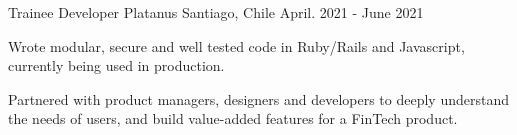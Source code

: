 

\begin{cventries}



\cventry
{Trainee Developer}
{Platanus}
{Santiago, Chile}
{April. 2021 - June 2021}
{
  \begin{cvitems}
    \item Wrote modular, secure and well tested code in Ruby/Rails and Javascript, currently being used in production.
    \item Partnered with product managers, designers and developers to deeply understand the needs of users, and build value-added features for
    a FinTech product.
  \end{cvitems}
}


\end{cventries}
